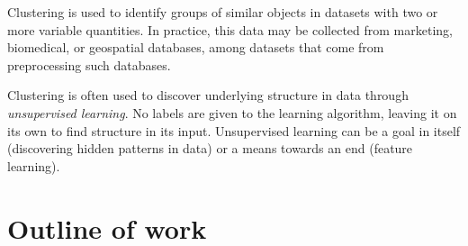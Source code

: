 Clustering is used to identify groups of similar objects in datasets with two or more variable quantities. In practice, this data may be collected from marketing, biomedical, or geospatial databases, among datasets that come from preprocessing such databases.

Clustering is often used to discover underlying structure in data through \textit{unsupervised learning}. No labels are given to the learning algorithm, leaving it on its own to find structure in its input. Unsupervised learning can be a goal in itself (discovering hidden patterns in data) or a means towards an end (feature learning).

\section{Outline of work}

